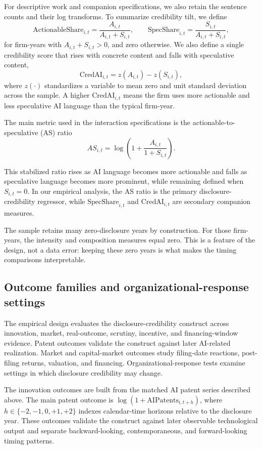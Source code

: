 For descriptive work and companion specifications, we also retain the sentence counts and their log transforms. To summarize credibility tilt, we define
\[
\mathrm{ActionableShare}_{i,t} = \frac{A_{i,t}}{A_{i,t} + S_{i,t}},
\qquad
\mathrm{SpecShare}_{i,t} = \frac{S_{i,t}}{A_{i,t} + S_{i,t}},
\]
for firm-years with $A_{i,t} + S_{i,t} > 0$, and zero otherwise. We also define a single credibility score that rises with concrete content and falls with speculative content,
\[
\mathrm{CredAI}_{i,t} = z(A_{i,t}) - z(S_{i,t}),
\]
where $z(\cdot)$ standardizes a variable to mean zero and unit standard deviation across the sample. A higher $\mathrm{CredAI}_{i,t}$ means the firm uses more actionable and less speculative AI language than the typical firm-year.

The main metric used in the interaction specifications is the actionable-to-speculative (AS) ratio
\[
AS_{i,t} = \log\left(1 + \frac{A_{i,t}}{1 + S_{i,t}}\right).
\]

This stabilized ratio rises as AI language becomes more actionable and falls as speculative language becomes more prominent, while remaining defined when $S_{i,t} = 0$. In our empirical analysis, the AS ratio is the primary disclosure-credibility regressor, while $\mathrm{SpecShare}_{i,t}$ and $\mathrm{CredAI}_{i,t}$ are secondary companion measures.

The sample retains many zero-disclosure years by construction. For those firm-years, the intensity and composition measures equal zero. This is a feature of the design, not a data error: keeping these zero years is what makes the timing comparisons interpretable.

\subsection{Outcome families and organizational-response settings}

The empirical design evaluates the disclosure-credibility construct across innovation, market, real-outcome, scrutiny, incentive, and financing-window evidence. Patent outcomes validate the construct against later AI-related realization. Market and capital-market outcomes study filing-date reactions, post-filing returns, valuation, and financing. Organizational-response tests examine settings in which disclosure credibility may change.

The innovation outcomes are built from the matched AI patent series described above. The main patent outcome is $\log(1+\mathrm{AIPatents}_{i,t+h})$, where $h \in \{-2,-1,0,+1,+2\}$ indexes calendar-time horizons relative to the disclosure year. These outcomes validate the construct against later observable technological output and separate backward-looking, contemporaneous, and forward-looking timing patterns.


